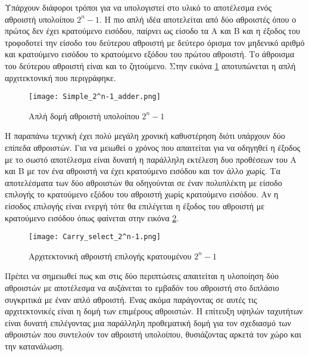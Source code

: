 Υπάρχουν διάφοροι τρόποι για να υπολογιστεί στο υλικό το αποτέλεσμα 
ενός αθροιστή υπολοίπου $2^n-1$.
Η πιο απλή ιδέα αποτελείται από δύο αθροιστές όπου ο πρώτος δεν έχει
κρατούμενο εισόδου, παίρνει ως είσοδο τα Α και Β και η έξοδος του τροφοδοτεί
την είσοδο του δεύτερου αθροιστή με δεύτερο όρισμα τον μηδενικό αριθμό
και κρατούμενο εισόδου το κρατούμενο εξόδου του πρώτου αθροιστή. Το άθροισμα 
του δεύτερου αθροιστή είναι και το ζητούμενο. Στην εικόνα \ref{fig:2^n-1_simple_adder}
αποτυπώνεται η απλή αρχιτεκτονική που περιγράφηκε.
\begin{figure}[H]
    \centering
    \texttt{[image: Simple\_2^n-1\_adder.png]}
    \caption{Απλή δομή αθροιστή υπολοίπου $2^n-1$}
    \label{fig:2^n-1_simple_adder}
\end{figure}
Η παραπάνω τεχνική έχει πολύ μεγάλη χρονική καθυστέρηση διότι υπάρχουν δύο 
επίπεδα αθροιστών. Για να μειωθεί ο χρόνος που απαιτείται για να οδηγηθεί η έξοδος
με το σωστό αποτέλεσμα είναι δυνατή η παράλληλη εκτέλεση δυο προθέσεων του Α και Β
με τον ένα αθροιστή να έχει κρατούμενο εισόδου και τον άλλο χωρίς. Τα αποτελέσματα 
των δύο αθροιστών θα οδηγούνται σε έναν πολυπλέκτη με είσοδο επιλογής το κρατούμενο 
εξόδου του αθροιστή χωρίς κρατούμενο εισόδου. Αν η είσοδος επιλογής είναι ενεργή 
τότε θα επιλέγεται η έξοδος του αθροιστή με κρατούμενο εισόδου όπως φαίνεται στην 
 εικόνα \ref{fig:2^n-1_carry_select_adder}.
\begin{figure}[H]
    \centering
    \texttt{[image: Carry\_select\_2^n-1.png]}
    \caption{Αρχιτεκτονική αθροιστή επιλογής κρατουμένου $2^n-1$}
    \label{fig:2^n-1_carry_select_adder}
\end{figure}
Πρέπει να σημειωθεί πως και στις δύο περιπτώσεις απαιτείται η υλοποίηση δύο αθροιστών 
με αποτέλεσμα να αυξάνεται το εμβαδόν του αθροιστή στο διπλάσιο συγκριτικά με έναν απλό αθροιστή.
Ένας ακόμα παράγοντας σε αυτές τις αρχιτεκτονικές είναι η δομή των επιμέρους αθροιστών. 
Η επίτευξη υψηλών ταχυτήτων είναι δυνατή επιλέγοντας μια παράλληλη προθεματική δομή 
για τον σχεδιασμό των αθροιστών που συντελούν τον αθροιστή υπολοίπου, θυσιάζοντας αρκετά
τον χώρο και την κατανάλωση.

